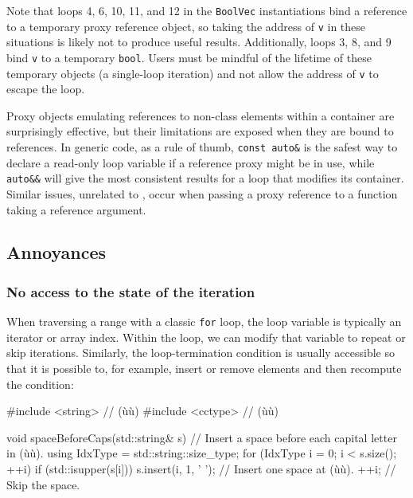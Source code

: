 {{{Note that loops 4, 6, 10, 11, and 12 in the \lstinline!BoolVec!
instantiations bind a reference to a temporary proxy reference object,
so taking the address of \lstinline!v! in these situations is likely not to
produce useful results. Additionally, loops 3, 8, and 9 bind \lstinline!v!
to a temporary \lstinline!bool!. Users must be mindful of the lifetime of
these temporary objects (a single-loop iteration) and not allow the
address of \lstinline!v! to escape the loop.

\noindent Proxy objects emulating references to non-class elements within a
container are surprisingly effective, but their limitations are exposed
when they are bound to references. In generic code, as a rule of thumb,
\lstinline!const!~\lstinline!auto&! is the safest way to declare a read-only
loop variable if a reference proxy might be in use, while
\lstinline!auto&&! will give the most consistent results for a loop that
modifies its container. Similar issues, unrelated to , occur when passing a proxy reference to a function
taking a reference argument.

\subsection[Annoyances]{Annoyances}\label{annoyances}

\subsubsection[No access to the state of the iteration]{No access to the state of the iteration}\label{no-access-to-the-state-of-the-iteration}

When traversing a range with a classic \lstinline!for! loop, the loop
variable is typically an iterator or array index. Within the loop, we
can modify that variable to repeat or skip iterations. Similarly, the
loop-termination condition is usually accessible so that it is possible
to, for example, insert or remove elements and then recompute the
condition:

\begin{emcppslisting}[emcppsbatch=e7]
#include <string>  // (ù{}ù)
#include <cctype>  // (ù{}ù)

void spaceBeforeCaps(std::string& s)
{
    // Insert a space before each capital letter in (ù{}ù).
    using IdxType = std::string::size_type;
    for (IdxType i = 0; i < s.size(); ++i)
    {
        if (std::isupper(s[i]))
        {
            s.insert(i, 1, ' ');  // Insert one space at (ù{}ù).
            ++i;                  // Skip the space.
        }
    }
}
\end{emcppslisting}


}}}

